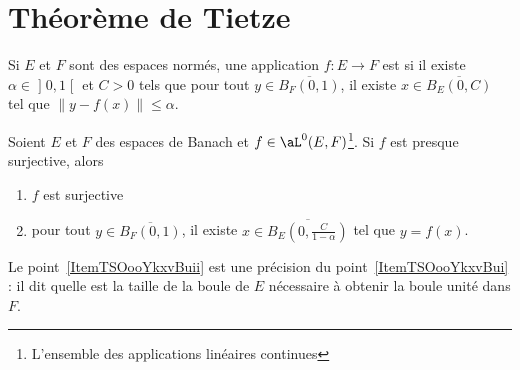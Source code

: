 \section{Théorème de Tietze}

\begin{definition}
	Si \( E\) et \( F\) sont des espaces normés, une application \( f\colon E\to F\) est  si il existe \( \alpha\in\mathopen] 0 , 1 \mathclose[\) et \( C>0\) tels que pour tout \( y\in \overline{ B_F(0,1) }\), il existe \( x\in\overline{ B_E(0,C) }\) tel que \( \| y-f(x) \|\leq \alpha\).
\end{definition}

\begin{lemma}   \label{LemBQLooRXhJzK}
	Soient \( E\) et \( F\) des espaces de Banach et \( f\in\aL^0(E,F)\)\footnote{L'ensemble des applications linéaires continues}. Si \( f\) est presque surjective, alors
	\begin{enumerate}
		\item   \label{ItemTSOooYkxvBui}
		      \( f\) est surjective
		\item\label{ItemTSOooYkxvBuii}
		      pour tout \( y\in \overline{ B_F(0,1) }\), il existe \( x\in\overline{ B_E(0,\frac{ C }{ 1-\alpha }) }\) tel que \( y=f(x)\).
	\end{enumerate}
\end{lemma}
Le point~\ref{ItemTSOooYkxvBuii} est une précision du point~\ref{ItemTSOooYkxvBui} : il dit quelle est la taille de la boule de \( E\) nécessaire à obtenir la boule unité dans \( F\).

